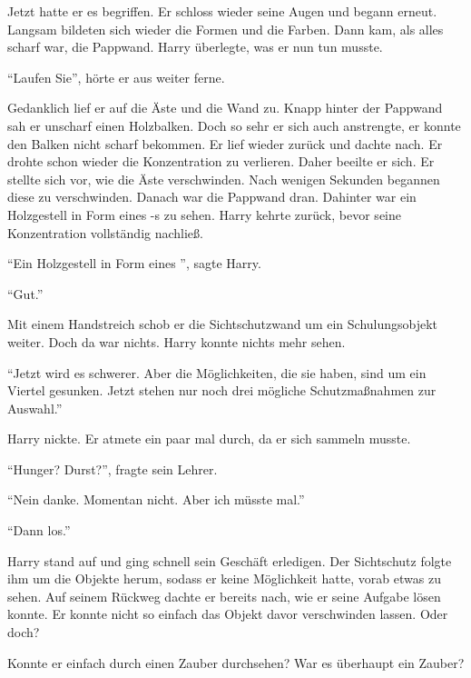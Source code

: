 
Jetzt hatte er es begriffen. Er schloss wieder seine Augen und begann erneut. Langsam bildeten sich wieder die Formen und die Farben. Dann kam, als alles scharf war, die Pappwand. Harry überlegte, was er nun tun musste.

\enquote{Laufen Sie}, hörte er aus weiter ferne.

Gedanklich lief er auf die Äste und die Wand zu. Knapp hinter der Pappwand sah er unscharf einen Holzbalken. Doch so sehr er sich auch anstrengte, er konnte den Balken nicht scharf bekommen. Er lief wieder zurück und dachte nach. Er drohte schon wieder die Konzentration zu verlieren. Daher beeilte er sich. Er stellte sich vor, wie die Äste verschwinden. Nach wenigen Sekunden begannen diese zu verschwinden. Danach war die Pappwand dran. Dahinter war ein Holzgestell in Form eines -s zu sehen. Harry kehrte zurück, bevor seine Konzentration vollständig nachließ.

\enquote{Ein Holzgestell in Form eines }, sagte Harry.

\enquote{Gut.}

Mit einem Handstreich schob er die Sichtschutzwand um ein Schulungsobjekt weiter. Doch da war nichts. Harry konnte nichts mehr sehen.

\enquote{Jetzt wird es schwerer. Aber die Möglichkeiten, die sie haben, sind um ein Viertel gesunken. Jetzt stehen nur noch drei mögliche Schutzmaßnahmen zur Auswahl.}

Harry nickte. Er atmete ein paar mal durch, da er sich sammeln musste.

\enquote{Hunger? \gst Durst?}, fragte sein Lehrer.

\enquote{Nein danke. Momentan nicht. Aber ich müsste mal.}

\enquote{Dann los.}

Harry stand auf und ging schnell sein Geschäft erledigen. Der Sichtschutz folgte ihm um die Objekte herum, sodass er keine Möglichkeit hatte, vorab etwas zu sehen. Auf seinem Rückweg dachte er bereits nach, wie er seine Aufgabe lösen konnte. Er konnte nicht so einfach das Objekt davor verschwinden lassen. Oder doch?

Konnte er einfach durch einen Zauber durchsehen? War es überhaupt ein Zauber?

